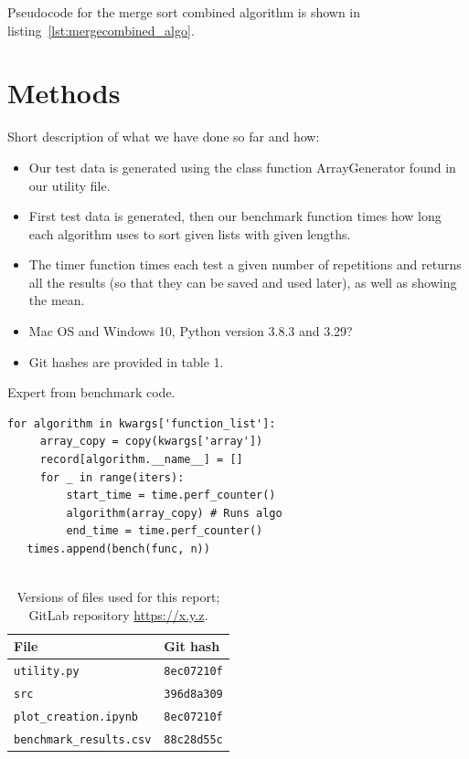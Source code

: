 \documentclass[sigconf, nonacm, natbib, screen, balance=False]{acmart}
\begin{document}
Pseudocode for the merge sort combined algorithm is shown in listing~\ref{lst:mergecombined_algo}. 

\section{Methods}\label{sec:methods}

Short description of what we have done so far and how:
\begin{itemize}
\item Our test data is generated using the class function ArrayGenerator found in our utility file.
\item First test data is generated, then our benchmark function times how long each algorithm uses to sort given lists with given lengths.  
\item The timer function times each test a given number of repetitions and returns all the results (so that they can be saved and used later), as well as showing the mean.
\item Mac OS and Windows 10, Python version 3.8.3 and 3.29?
\item Git hashes are provided in table 1.
\end{itemize}

\begin{listing}
  \caption{Expert from benchmark code.}
  \label{lst:bench_setup}
  \begin{lstlisting}
for algorithm in kwargs['function_list']:
     array_copy = copy(kwargs['array'])
     record[algorithm.__name__] = []
     for _ in range(iters):
         start_time = time.perf_counter()
         algorithm(array_copy) # Runs algo
         end_time = time.perf_counter()
   times.append(bench(func, n))
   
  \end{lstlisting}
\end{listing}

\begin{table}
  \caption{Versions of files used for this report; GitLab repository
    \url{https://x.y.z}.}
  \label{tab:hashes}
  \begin{tabular}{ll}
    \hline
    File & Git hash \\\hline
    \verb!utility.py! & \verb!8ec07210f! \\
    \verb!src! & \verb!396d8a309! \\
    \verb!plot_creation.ipynb! & \verb!8ec07210f! \\
    \verb!benchmark_results.csv! & \verb!88c28d55c! \\\hline
  \end{tabular}
\end{table}
\end{document}
